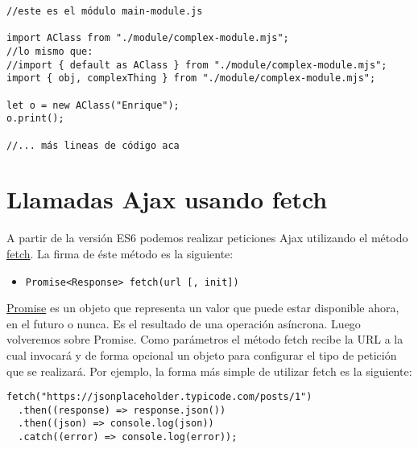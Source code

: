 \documentclass[a4paper, oneside, titlepage, 12pt]{paper}
\begin{document}
\begin{verbatim}
//este es el módulo main-module.js

import AClass from "./module/complex-module.mjs";
//lo mismo que:
//import { default as AClass } from "./module/complex-module.mjs";
import { obj, complexThing } from "./module/complex-module.mjs";

let o = new AClass("Enrique");
o.print();

//... más lineas de código aca 
\end{verbatim}


\section{Llamadas Ajax usando fetch}

A partir de la versión ES6 podemos realizar peticiones Ajax utilizando el método \href{https://developer.mozilla.org/es/docs/Web/API/WindowOrWorkerGlobalScope/fetch}{fetch}. La firma de éste método es la siguiente:

\begin{itemize}
 \item \texttt{Promise<Response> fetch(url [, init])} 
\end{itemize}

\href{https://developer.mozilla.org/es/docs/Web/JavaScript/Reference/Global_Objects/Promise}{Promise} es un objeto que representa un valor que puede estar disponible ahora, en el futuro o nunca. Es el resultado de una operación asíncrona. Luego volveremos sobre Promise. Como parámetros el método fetch recibe la URL a la cual invocará y de forma opcional un objeto para configurar el tipo de petición que se realizará. Por ejemplo, la forma más simple de utilizar fetch es la siguiente:

\begin{verbatim}
fetch("https://jsonplaceholder.typicode.com/posts/1")
  .then((response) => response.json())
  .then((json) => console.log(json))
  .catch((error) => console.log(error));
\end{verbatim}
\end{document}
